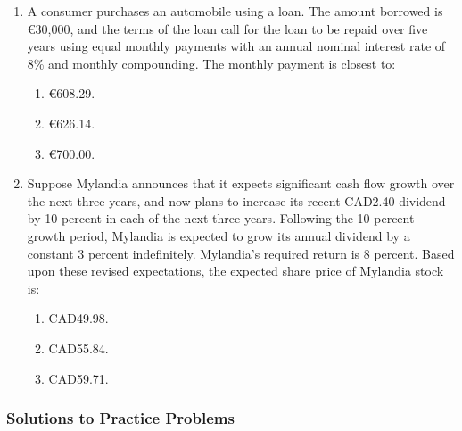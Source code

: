 \begin{enumerate}
	\item A consumer purchases an automobile using a loan. The amount borrowed is €30,000, and the terms of the loan call for the loan to be repaid over five years using equal monthly payments with an annual nominal interest rate of 8\% and monthly compounding. The monthly payment is closest to:
	      \begin{enumerate}[label=\Alph*.]
		      \item €608.29.
		      \item €626.14.
		      \item €700.00.
	      \end{enumerate}

	\item Suppose Mylandia announces that it expects significant cash flow growth over the next three years, and now plans to increase its recent CAD2.40 dividend by 10 percent in each of the next three years. Following the 10 percent growth period, Mylandia is expected to grow its annual dividend by a constant 3 percent indefinitely. Mylandia’s required return is 8 percent. Based upon these revised expectations, the expected share price of Mylandia stock is:
	      \begin{enumerate}[label=\Alph*.]
		      \item CAD49.98.
		      \item CAD55.84.
		      \item CAD59.71.
	      \end{enumerate}
\end{enumerate}

\subsubsection{Solutions to Practice Problems}
\label{subsec:app_Solutions_M4}


